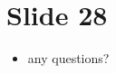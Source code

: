 \documentclass[
  12pt]{findlay}
\providecommand{\tightlist}{\setlength{\itemsep}{0pt}\setlength{\parskip}{0pt}}
\begin{document}
\hypertarget{slide-28}{%
\section{Slide 28}\label{slide-28}}

\begin{itemize}
\tightlist
\item
  any questions?
\end{itemize}

\clearpage

\printbibliography
\end{document}
